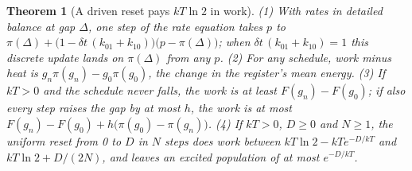 \documentclass[11pt,twoside]{article}
\theoremstyle{thielethm}
\newtheorem{theorem}{Theorem}[section]
\theoremstyle{thieledef}
\theoremstyle{thieledef}
\theoremstyle{thieledef}
\theoremstyle{thielethm}
\theoremstyle{thieleobs}
\theoremstyle{thielethm}
\begin{document}
\begin{theorem}[A driven reset pays $kT \ln 2$ in work]\label{thm:u24-driven}
(1) With rates in detailed balance at gap $\Delta$, one step of the rate equation takes $p$ to
$\pi(\Delta) + \big(1 - \delta t\,(k_{01} + k_{10})\big)\big(p - \pi(\Delta)\big)$; when
$\delta t\,(k_{01} + k_{10}) = 1$ this discrete update lands on $\pi(\Delta)$ from any $p$. (2) For any schedule, work
minus heat is $g_n \pi(g_n) - g_0 \pi(g_0)$, the change in the register's mean energy. (3) If
$kT > 0$ and the schedule never falls, the work is at least $F(g_n) - F(g_0)$; if also every
step raises the gap by at most $h$, the work is at most $F(g_n) - F(g_0) + h\big(\pi(g_0) -
\pi(g_n)\big)$. (4) If $kT > 0$, $D \ge 0$ and $N \ge 1$, the uniform reset from 0 to $D$ in $N$
steps does work between $kT \ln 2 - kT e^{-D/kT}$ and $kT \ln 2 + D/(2N)$, and leaves an excited
population of at most $e^{-D/kT}$.
\end{theorem}
\end{document}
